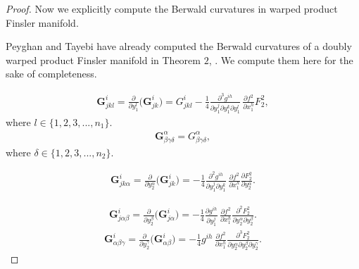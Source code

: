 \documentclass[pdflatex,sn-mathphys-num]{sn-jnl}%
\theoremstyle{thmstyleone}%
\theoremstyle{thmstyletwo}%
\theoremstyle{thmstylethree}%
\begin{document}
\begin{proof}
Now we explicitly compute the  Berwald curvatures in  warped product Finsler manifold. 

Peyghan and Tayebi have already computed the Berwald curvatures of a doubly warped product Finsler manifold in 
Theorem $2$, \cite{MLA}. We compute them here  
for the sake of completeness. 








		\begin{align}\label{eq11}
			\mathbf{G}^i_{jkl}=\frac{\partial}{\partial y_1^l} \Bigg(\mathbf{G}^i_{jk}\Bigg)= G_{jkl}^i-\frac{1}{4}\frac{\partial^3 g^{ih}}{\partial y_1^j\partial y_1^k\partial y_1^l}\,\frac{\partial f^2}{\partial x_1^h} F_2^2,
		\end{align}
		where $l\in \{1,2,3,...,n_1\}.$
		\begin{align}\label{eq2}
			\mathbf{G}^\alpha_{\beta\gamma\delta}=G^\alpha_{\beta\gamma\delta},   
		\end{align}
		where $\delta\in \{1,2,3,...,n_2\}.$
		
		\begin{align}\label{eq3}
			\mathbf{G}^i_{jk\alpha}=\frac{\partial}{\partial y_2^\alpha} \Bigg(\mathbf{G}^i_{jk}\Bigg)=-\frac{1}{4}\frac{\partial^2 g^{ih}}{\partial y_1^j\partial y_1^k}\,\frac{\partial f^2}{\partial x_1^h} \frac{\partial F_2^2}{\partial y_2^\alpha}.
		\end{align}
		
		\begin{align}\label{eq4}
			\mathbf{G}^i_{j\alpha\beta}=\frac{\partial}{\partial y_2^\beta} \Bigg(\mathbf{G}^i_{j\alpha}\Bigg)=-\frac{1}{4}\frac{\partial g^{ih}}{\partial y_1^j}\,\frac{\partial f^2}{\partial x_1^h} \frac{\partial^2 F_2^2}{\partial y_2^\alpha\partial y_2^\beta}.  
		\end{align}
		\begin{align}\label{eq5}
			\mathbf{G}^i_{\alpha\beta \gamma}=\frac{\partial}{\partial y_2^\gamma}\Bigg(\mathbf{G}^i_{\alpha \beta}\Bigg) =-\frac{1}{4} g^{ih}\,\frac{\partial f^2}{\partial x_1^h} \frac{\partial^3 F_2^2}{\partial y_2^\alpha\partial y_2^\beta \partial y_2^\gamma}.  
		\end{align}
		
		

\end{proof}
\end{document}
